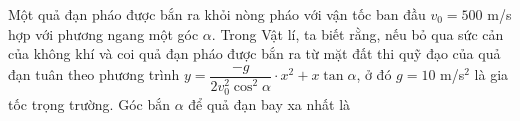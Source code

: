 \begin{bt}%
 
	Một quả đạn pháo được bắn ra khỏi nòng pháo với vận tốc ban đầu $ v_0=500$ m/s hợp với phương ngang một góc $ \alpha $. Trong Vật lí, ta biết rằng, nếu bỏ qua sức cản của không khí và coi quả đạn pháo được bắn ra từ mặt đất thi quỹ đạo của quả đạn tuân theo phương trình $ y=\dfrac{-g}{2v_0^2\cos^2\alpha}\cdot x^2+x\tan \alpha $, ở đó $g = 10$ m/s$ ^2 $ là gia tốc trọng trường. Góc bắn $ \alpha $ để quả đạn bay xa nhất là
\end{bt}


